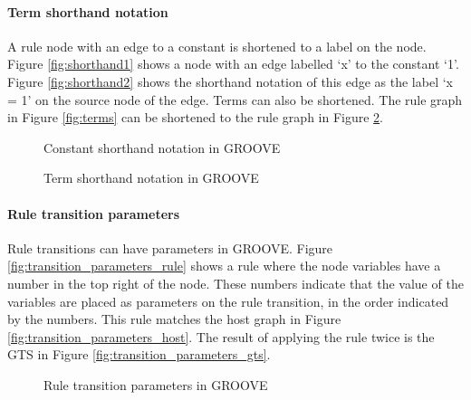 \paragraph*{Term shorthand notation}
A rule node with an edge to a constant is shortened to a label on the node. Figure \ref{fig:shorthand1} shows a node with an edge labelled `x' to the constant `1'. Figure \ref{fig:shorthand2} shows the shorthand notation of this edge as the label `x = 1' on the source node of the edge. Terms can also be shortened. The rule graph in Figure \ref{fig:terms} can be shortened to the rule graph in Figure \ref{fig:term_shorthand}.

\begin{figure}[h]
  \begin{center}
    \hspace{20px}
  \end{center}
  \caption{Constant shorthand notation in GROOVE}
  \label{fig:shorthand}
\end{figure}

\begin{figure}[h]
  \begin{center}
    
  \end{center}
  \caption{Term shorthand notation in GROOVE}
  \label{fig:term_shorthand}
\end{figure}

\paragraph*{Rule transition parameters}
Rule transitions can have parameters in GROOVE. Figure \ref{fig:transition_parameters_rule} shows a rule where the node variables have a number in the top right of the node. These numbers indicate that the value of the variables are placed as parameters on the rule transition, in the order indicated by the numbers. This rule matches the host graph in Figure \ref{fig:transition_parameters_host}. The result of applying the rule twice is the GTS in Figure \ref{fig:transition_parameters_gts}.

\begin{figure}[h]
  \begin{center}
    \hspace{20px}
    \hspace{20px}
    \subfloat[GTS]{\label{fig:transition_parameters_gts}}
  \end{center}
  \caption{Rule transition parameters in GROOVE}
  \label{fig:transition_parameters}
\end{figure}

